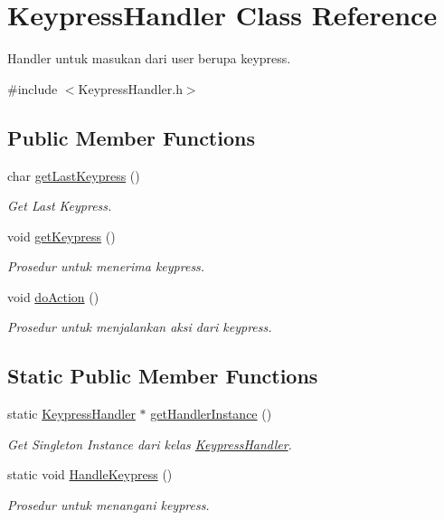 \hypertarget{class_keypress_handler}{}\section{Keypress\+Handler Class Reference}
\label{class_keypress_handler}


Handler untuk masukan dari user berupa keypress.  




{\ttfamily \#include $<$Keypress\+Handler.\+h$>$}

\subsection*{Public Member Functions}
\begin{DoxyCompactItemize}
\item 
char \hyperlink{class_keypress_handler_acafd4a446c38d483d5bcbf758223965b}{get\+Last\+Keypress} ()
\begin{DoxyCompactList}\small\item\em Get Last Keypress. \end{DoxyCompactList}\item 
void \hyperlink{class_keypress_handler_a2a797123df099db8277254a9b864f6e0}{get\+Keypress} ()
\begin{DoxyCompactList}\small\item\em Prosedur untuk menerima keypress. \end{DoxyCompactList}\item 
void \hyperlink{class_keypress_handler_a519d07b7795f7efbea96a5b35ceb90ff}{do\+Action} ()
\begin{DoxyCompactList}\small\item\em Prosedur untuk menjalankan aksi dari keypress. \end{DoxyCompactList}\end{DoxyCompactItemize}
\subsection*{Static Public Member Functions}
\begin{DoxyCompactItemize}
\item 
static \hyperlink{class_keypress_handler}{Keypress\+Handler} $\ast$ \hyperlink{class_keypress_handler_a1c8568970784217a612470d9713bcbeb}{get\+Handler\+Instance} ()
\begin{DoxyCompactList}\small\item\em Get Singleton Instance dari kelas \hyperlink{class_keypress_handler}{Keypress\+Handler}. \end{DoxyCompactList}\item 
static void \hyperlink{class_keypress_handler_adfb5ff6e1aa6d4c3692d6097c2fbbe72}{Handle\+Keypress} ()
\begin{DoxyCompactList}\small\item\em Prosedur untuk menangani keypress. \end{DoxyCompactList}\end{DoxyCompactItemize}


